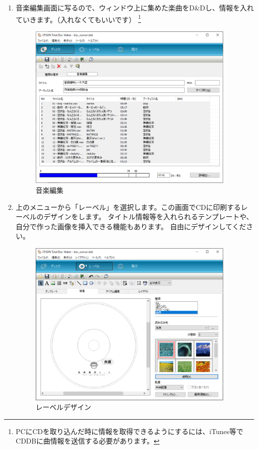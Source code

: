 \documentclass[11pt,a4paper]{jsarticle}
\begin{document}
\begin{enumerate}
                        \item 音楽編集画面に写るので、ウィンドウ上に集めた楽曲をD\&Dし、情報を入れていきます。（入れなくてもいいです）
                            \footnote{PCにCDを取り込んだ時に情報を取得できるようにするには、iTunes等でCDDBに曲情報を送信する必要があります。}
                        \begin{figure}[H]
                            \begin{center}
                            \includegraphics[width=10.0cm]{./image/pp5002.eps}
                            \caption{音楽編集}
                            \label{fig:pp5002}
                            \end{center}
                        \end{figure}

                        \item 上のメニューから「レーベル」を選択します。この画面でCDに印刷するレーベルのデザインをします。
                            タイトル情報等を入れられるテンプレートや、自分で作った画像を挿入できる機能もあります。
                            自由にデザインしてください。
                        \begin{figure}[H]
                            \begin{center}
                            \includegraphics[width=10.0cm]{./image/pp5003.eps}
                            \caption{レーベルデザイン}
                            \label{fig:pp5003}
                            \end{center}
                        \end{figure}
                        

\end{enumerate}
\end{document}
